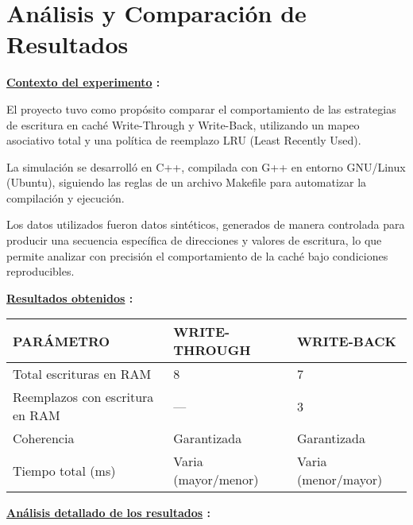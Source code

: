 \documentclass{article}
\begin{document}
\quad
\newpage



\section{Análisis y Comparación de Resultados}

\quad

\textbf{ \underline{Contexto del experimento} :}

\quad

{El proyecto tuvo como propósito comparar el comportamiento de las estrategias de escritura en caché Write-Through y Write-Back, utilizando un mapeo asociativo total y una política de reemplazo LRU (Least Recently Used).}

\quad

{La simulación se desarrolló en C++, compilada con G++ en entorno GNU/Linux (Ubuntu), siguiendo las reglas de un archivo Makefile para automatizar la compilación y ejecución.}

\quad

{Los datos utilizados fueron datos sintéticos, generados de manera controlada para producir una secuencia específica de direcciones y valores de escritura, lo que permite analizar con precisión el comportamiento de la caché bajo condiciones reproducibles.}

\quad

\textbf{ \underline{Resultados obtenidos} :}

\quad

\begin{tabular}{| p{4cm} |p{4cm} | p{4cm} |}
    \hline
    PARÁMETRO & WRITE-THROUGH & WRITE-BACK \\
    \hline
    Total escrituras en RAM & 8 & 7\\
    \hline
    Reemplazos con escritura en RAM & — & 3 \\
    \hline
    Coherencia & Garantizada & Garantizada \\
    \hline
    Tiempo total (ms) & Varia (mayor/menor) & Varia (menor/mayor) \\
    \hline

\end{tabular}\vspace{0.8cm}

\quad

\textbf{ \underline{Análisis detallado de los resultados} :}

\quad
\end{document}

